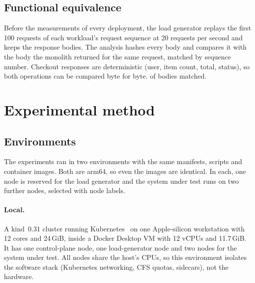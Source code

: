 \subsection{Functional equivalence}

Before the measurements of every deployment, the load generator replays the first 100 requests of each
workload's request sequence at 20 requests per second and keeps the response bodies. The analysis hashes
every body and compares it with the body the monolith returned for the same request, matched by sequence
number. Checkout responses
are deterministic (user, item count, total, status), so both operations can be compared byte for byte.
 of  bodies matched.

\section{Experimental method}
\label{sec:method}

\subsection{Environments}
\label{sec:env}

The experiments ran in two environments with the same manifests, scripts and container images. Both are arm64,
so even the images are identical. In each, one node is reserved for the load generator and the system under test
runs on two further nodes, selected with node labels.

\paragraph{Local.} A kind~0.31 cluster running Kubernetes~ on one Apple-silicon workstation with
12 cores and 24\,GiB, inside a Docker Desktop VM with 12 vCPUs and 11.7\,GiB. It has one control-plane node, one
load-generator node and two nodes for the system under test. All nodes share the host's CPUs, so this environment isolates the software stack
(Kubernetes networking, CFS quotas, sidecars), not the hardware.

